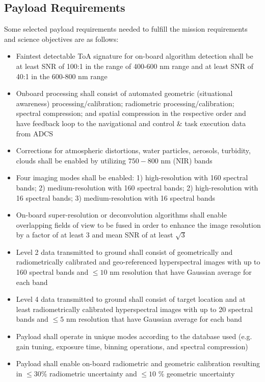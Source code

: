 \subsection{Payload Requirements}
Some selected payload requirements needed to fulfill the mission requirements and science objectives are as follows:
\begin{itemize}
\item Faintest detectable ToA signature for on-board algorithm detection shall be at least SNR of 100:1 in the range of 400-600 nm range and at least SNR of 40:1 in the 600-800 nm range 
\item Onboard processing shall consist of automated geometric (situational awareness) processing/calibration; radiometric processing/calibration; spectral compression; and spatial compression in the respective order and have feedback loop to the navigational and control \& task execution data from ADCS
\item Corrections for atmospheric distortions, water particles, aerosols, turbidity, clouds shall be enabled by utilizing $750-800$ nm (NIR) bands
\item Four imaging modes shall be enabled: 1) high-resolution with 160 spectral bands; 2) medium-resolution with 160 spectral bands; 2) high-resolution with 16 spectral bands; 3) medium-resolution with 16 spectral bands
\item On-board super-resolution or deconvolution algorithms shall enable overlapping fields of view to be fused in order to enhance the image resolution by a factor of at least $3$ and mean SNR of at least $\sqrt{3}$
\item Level 2 data transmitted to ground shall consist of geometrically and radiometrically calibrated and geo-referenced hyperspectral images with up to 160 spectral bands and $\leq 10$ nm resolution that have Gaussian average for each band
\item Level 4 data transmitted to ground shall consist of target location and at least radiometrically calibrated hyperspectral images with up to 20 spectral bands and $\leq 5$ nm resolution that have Gaussian average for each band 
\item Payload shall operate in unique modes according to the database used (e.g. gain tuning, exposure time, binning operations, and spectral compression)
\item Payload shall enable on-board radiometric and geometric calibration resulting in $\leq 30$\% radiometric uncertainty and $\leq 10$ \% geometric uncertainty
\end{itemize}

